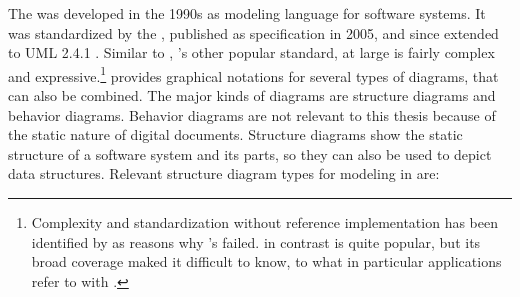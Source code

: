 The  was developed in the 1990s as
modeling language for  software systems. It was
standardized by the , published as
 specification in 2005, and since extended to UML 2.4.1
\cite{OMG2011}.  Similar to , 's other popular standard,
 at large is fairly complex and expressive.\footnote{Complexity and
standardization without reference implementation has been identified by
\textcite{Henning2006} as reasons why 's failed.  in
contrast is quite popular, but its broad coverage maked it difficult to know,
to what in particular applications refer to with .} 
provides graphical notations for several types of diagrams, that can also be
combined.  The major kinds of  diagrams are structure diagrams and
behavior diagrams. Behavior diagrams are not relevant to this thesis because of
the static nature of digital documents. Structure diagrams show the static
structure of a software system and its parts, so they can also be used to
depict data structures. Relevant structure diagram types for modeling in
 are:

